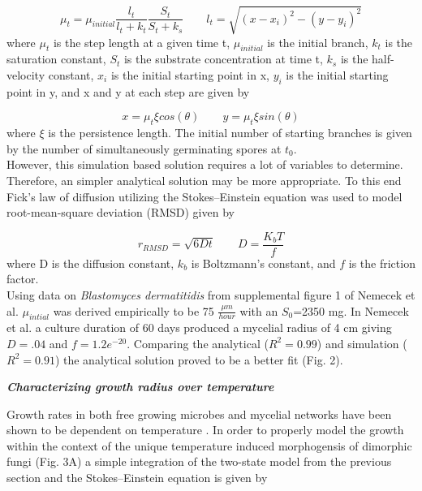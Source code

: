 \documentclass[preprint,12pt]{elsarticle}
\begin{document}
\begin{equation}
\mu_{t} = \mu_{initial}\frac{l_t}{l_t + k_t}\frac{S_t}{S_t + k_s}
\label{eqn:1}
\qquad
l_{t} = \sqrt{(x-x_i)^{2}-(y-y_i)^{2}}
\label{eqn:1}
\end{equation} 
%
where $\mu_{t}$ is the step length at a given time t,  $\mu_{initial}$ is the initial branch, $k_{t}$ is the saturation constant, $S_{t}$ is the substrate concentration at time t, $k_{s}$ is the half-velocity constant, $x_{i}$ is the initial starting point in x, $y_{i}$ is the initial starting point in y, and x and y at each step are given by

\begin{equation}
x = \mu_{t} \xi cos(\theta)
\qquad
y = \mu_{t} \xi sin(\theta)
\end{equation}
%
where $\xi$ is the persistence length. The initial number of starting branches is given by the number of simultaneously germinating spores at $t_0$. \\

However, this simulation based solution requires a lot of variables to determine. Therefore, an simpler analytical solution may be more appropriate. To this end Fick's law of diffusion \cite{Fick1855-zf} utilizing the Stokes–Einstein equation \cite{Einstein1956-yu} was used to model root-mean-square deviation (RMSD) given by

\begin{equation}
r_{RMSD} = \sqrt{6Dt}
\qquad
D = \frac{K_{b}T}{f}
\end{equation}
%
where D is the diffusion constant, $k_{b}$ is Boltzmann's constant, and $f$ is the friction factor. \\

Using data on \textit{Blastomyces dermatitidis} from supplemental figure 1 of Nemecek et al. \citep{Nemecek2006-ff} $\mu_{intial}$ was derived empirically to be 75 $\frac{\mu m}{hour}$ with an $S_0$=2350 mg. In Nemecek et al. a culture duration of 60 days produced a mycelial radius of 4 cm giving $D = .04$ and $f = 1.2e^{-20}$. Comparing the analytical ($R^{2}=0.99$) and simulation ($R^{2}=0.91$) the analytical solution proved to be a better fit (Fig. 2). \newline

\textbf{\textit{Characterizing growth radius over temperature}}
\newline

Growth rates in both free growing microbes and mycelial networks have been shown to be dependent on temperature \citep{Domingues2016-jd,Lopez-Moral2017-qi,Moral2011-az}. In order to properly model the growth within the context of the unique temperature induced morphogensis of dimorphic fungi (Fig. 3A) a simple integration of the two-state model from the previous section and the Stokes–Einstein equation \cite{Einstein1956-yu} is given by 
\end{document}
